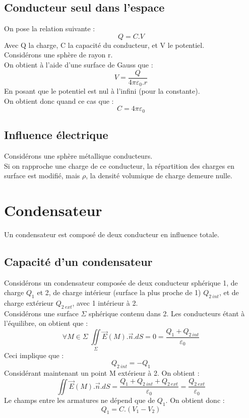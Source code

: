 \subsection{Conducteur seul dans l'espace}
On pose la relation suivante : 
$$Q = C.V$$
Avec Q la charge, C la capacité du conducteur, et V le potentiel.\\
Considérons une sphère de rayon r.\\
On obtient à l'aide d'une surface de Gauss que : 
$$V = \dfrac{Q}{4\pi\varepsilon_0.r}$$
En posant que le potentiel est nul à l'infini (pour la constante).\\
On obtient donc quand ce cas que : 
$$C = 4\pi\varepsilon_0$$
\subsection{Influence électrique}
Considérons une sphère métallique conducteurs.\\
Si on rapproche une charge de ce conducteur, la répartition des charges en surface est modifié, mais $\rho$, la densité volumique de charge demeure nulle.
\section{Condensateur}
\begin{de}
Un condensateur est composé de deux conducteur en influence totale.
\end{de}
\subsection{Capacité d'un condensateur}
Considérons un condensateur composée de deux conducteur sphérique 1, de charge $Q_1$ et 2, de charge intérieur (surface la plus proche de 1) $Q_{2~ int}$, et de charge extérieur $Q_{2~ ext}$, avec 1 intérieur à 2.\\
Considérons une surface $\Sigma$ sphérique contenu dans 2. Les conducteurs étant à l'équilibre, on obtient que : 
$$\forall M \in \Sigma~ \underset{\Sigma}\iint \overrightarrow{E}(M).\overrightarrow{n}.dS = 0 = \dfrac{Q_1 + Q_{2~ int}}{\varepsilon_0}$$
Ceci implique que : 
$$Q_{2~ int} = -Q_1$$
Considérant maintenant un point M extérieur à 2. On obtient : 
$$\iint \overrightarrow{E}(M).\overrightarrow{n}.dS = \dfrac{Q_1 + Q_{2~ int}+ Q_{2~ ext}}{\varepsilon_0} = \dfrac{Q_{2~ ext}}{\varepsilon_0}$$
Le champs entre les armatures ne dépend que de $Q_1$. On obtient donc :
$$Q_1 = C.(V_1-V_2)$$
